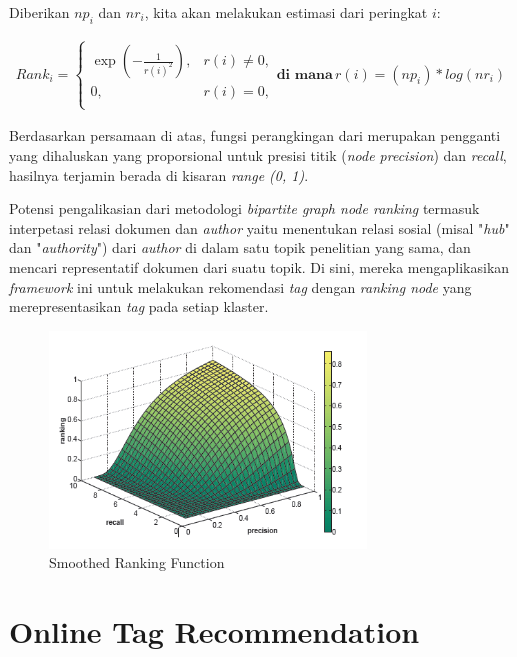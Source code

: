 Diberikan \(np_i\) dan \(nr_i\), kita akan melakukan estimasi dari peringkat \(i\):

\begin{equation}\label{rank_i}
\begin{split}
    Rank_i = \begin{cases} \exp(-\frac{1}{r(i)^2}) , & r(i) \neq 0, \\
    0, & r(i) = 0, \\
    \end{cases}
    \textbf{di mana}\, r(i) = (np_i) * log(nr_i)
\end{split}
\end{equation}


Berdasarkan persamaan di atas, fungsi perangkingan dari \cite{song2008autotag} merupakan pengganti yang dihaluskan yang proporsional untuk presisi titik (\textit{node precision}) dan \textit{recall}, hasilnya terjamin berada di kisaran \textit{range (0, 1)}.

Potensi pengalikasian dari metodologi \textit{bipartite graph node ranking} termasuk interpetasi relasi dokumen dan \textit{author} yaitu menentukan relasi sosial (misal "\textit{hub}" dan "\textit{authority}") dari \textit{author} di dalam satu topik penelitian yang sama, dan mencari representatif dokumen dari suatu topik. Di sini, mereka mengaplikasikan \textit{framework} ini untuk melakukan rekomendasi \textit{tag} dengan \textit{ranking node} yang merepresentasikan \textit{tag} pada setiap klaster.
\begin{figure}[H]
    \centering
    \includegraphics[width=0.75\textwidth]{gambar/Smoothed Ranking Function.PNG}
    \caption{Smoothed Ranking Function \cite{song2008autotag}}
    \label{gambar:smoothed_ranking_function}
\end{figure}

\section{Online Tag Recommendation}

